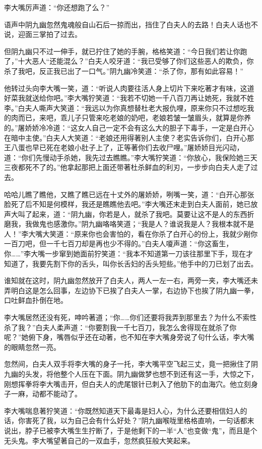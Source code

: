 \documentclass[12pt,oneside]{book}
\begin{document}
李大嘴厉声道：``你还想跑了么？''

语声中阴九幽忽然鬼魂般自山石后一掠而出，挡住了白夫人的去路！白夫人话也不说，迎面三掌拍了过去。

但阴九幽只不过一伸手，就已拧住了她的手腕，格格笑道：``今日我们若让你跑了，''十大恶人``还能混么？''白夫人咬牙道：``我已受够了你们这些恶人的欺负，你杀了我吧，反正我已出了一口气。''阴九幽冷笑道：``杀了你，那有如此容易！''

他转过头向李大嘴一笑，道：``听说人肉要往活人身上切片下来吃著才有味，这道好菜我就送给你吧。''李大嘴狞笑道：``我若不切她一千八百刀再让她死，我就不姓李。''白夫人嘶声大笑道：``我远以为你真想替杜老大报仇哩，原来你只不过想吃我的肉而已，来吧，乖儿子只管来吃老娘的奶吧，老娘若皱一皱眉头，就算是你养的。''屠娇娇冷冷道：``这女人自己一定不会有这么大的胆子下毒手，一定是白开心在暗中主使。''白夫人大笑道：``老娘还用得著别人主使？老实告诉你们，白开心那王八蛋也早已死在老娘小肚子上了，正等著你们去收尸哩。''屠娇娇目光闪动，道：``你们先慢动手杀她，我先过去瞧瞧。''李大嘴狞笑道：``你放心，我保险她三天三夜都死不了的。''他拿起那把上面还带著杜杀鲜血的利刃，一步步向白夫人走了过去。

哈哈儿瞧了瞧他，又瞧了瞧已远在十丈外的屠娇娇，咧嘴一笑，道：``白开心那张脸死了后不知是何模样，我还是瞧瞧他去吧。''李大嘴还末走到白夫人面前，她已放声大叫了起来，道：``阴九幽，你若是人，就杀了我吧。莫要让这不是人的东西折磨我，我做鬼也感激你。''阴九幽咯咯笑道；``我是人？谁说我是人？我根本就不是人！''李大嘴大笑道：``原来你也会害怕的，看在你杀了白开心的份上，我就少剐你一百刀吧，但一千七百刀却是再也少不得的。''白夫人嗄声道：``你这畜生，你\ldots\ldots{}''李大嘴一步窜到她面前狞笑道：``我本不知道第一刀该往那里下手，现在才知道了，我要先割下你的舌头，叫你长舌妇的舌头短些。''他手中的刀已划了出去。

谁知就在这时，阴九幽忽然放开了白夫人，两人一左一右，两旁一夹，李大嘴还未弄明白这是怎么回事，左边协下已挨了白夫人一掌，右边协下也挨了阴九幽一拳，口吐鲜血扑倒在地。

李大嘴居然还没有死，呻吟著道；``你\ldots\ldots 你们还要将我弄到那里去？为什么不索性杀了我？''白夫人柔声道：``你要割我一千七百刀，我怎么舍得现在就杀了你呢？''她俯下身，嘴唇似乎还在动著，也不知在李大嘴身旁说了句什么话，李大嘴的眼睛忽然一亮。

忽然间，白夫人双手将李大嘴的身子一托，李大嘴平空飞起三丈，竟一把揪住了阴九幽的头发，将他整个人压在下面。阴九幽做梦也想不到还有这一手，大惊之下，刚想挥拳将李大嘴击开，但白夫人的虎尾银针已刺入了他肋下的血海穴。他立刻身子一麻，动都不能动了。

李大嘴喘息著狞笑道：``你既然知道天下最毒是妇人心，为什么还要相信妇人的话，你害死了我，以为自己会有什么好处？''阴九幽喉咙里格格直响，一句话都末说出，脖子已被李大嘴生生拧断了，于是他剩下的一半``人''也变做``鬼''，而且是个无头鬼。李大嘴望著自己的一双血手，忽然疯狂般大笑起来。
\end{document}
